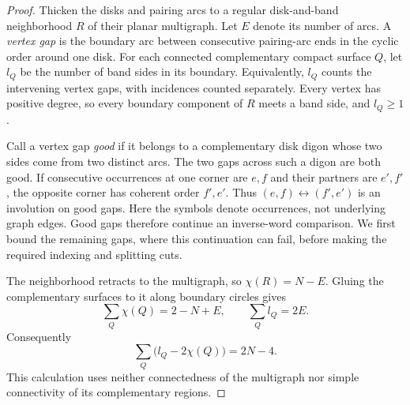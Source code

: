 \begin{proof}
Thicken the disks and pairing arcs to a regular disk-and-band
neighborhood $R$ of their planar multigraph.  Let $E$ denote its number
of arcs.  A \emph{vertex gap} is the boundary arc between consecutive
pairing-arc ends in the cyclic order around one disk.
For each connected complementary compact surface $Q$, let
$l_Q$ be the number of band sides in its boundary.  Equivalently, $l_Q$
counts the intervening vertex gaps, with incidences counted separately.
Every vertex has positive degree, so every boundary component of $R$
meets a band side, and $l_Q\ge1$.

Call a vertex gap \emph{good} if it belongs to a complementary disk
digon whose two sides come from two distinct arcs.  The two gaps across
such a digon are both good. If consecutive occurrences at one corner
are $e,f$ and their partners are $e',f'$, the opposite corner has
coherent order $f',e'$. Thus
$(e,f)\leftrightarrow(f',e')$ is an involution on good gaps. Here the
symbols denote occurrences, not underlying graph edges.
Good gaps therefore continue an inverse-word comparison.  We first
bound the remaining gaps, where this continuation can fail, before
making the required indexing and splitting cuts.

The neighborhood retracts to the multigraph, so $\chi(R)=N-E$.
Gluing the complementary surfaces to it along boundary circles gives
\[
 \sum_Q\chi(Q)=2-N+E,
 \qquad \sum_Q l_Q=2E.
\]
Consequently
\begin{equation}
 \sum_Q\bigl(l_Q-2\chi(Q)\bigr)=2N-4.
 \label{eq:planar-euler}
\end{equation}
This calculation uses neither connectedness of the multigraph nor
simple connectivity of its complementary regions.


\end{proof}
